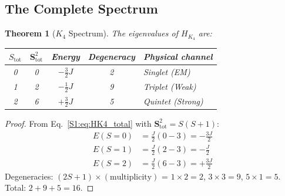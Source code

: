 \documentclass[11pt,a4paper]{article}
\newtheorem{theorem}{Theorem}[section]
\theoremstyle{definition}
\begin{document}
\subsection{The Complete Spectrum}

\begin{theorem}[$K_4$ Spectrum]
\label{S1:thm:K4_spectrum}
The eigenvalues of $H_{K_4}$ are:
\begin{center}
\begin{tabular}{ccccl}
\toprule
$S_{\mathrm{tot}}$ & $\mathbf{S}_{\mathrm{tot}}^2$ & Energy & Degeneracy & Physical channel\\
\midrule
0 & 0 & $-\tfrac{3}{2}J$ & 2 & Singlet (EM) \\
1 & 2 & $-\tfrac{1}{2}J$ & 9 & Triplet (Weak) \\
2 & 6 & $+\tfrac{3}{2}J$ & 5 & Quintet (Strong) \\
\bottomrule
\end{tabular}
\end{center}
\end{theorem}

\begin{proof}
From Eq.~\eqref{S1:eq:HK4_total} with $\mathbf{S}_{\mathrm{tot}}^2 = S(S+1)$:
\begin{align}
E(S=0) &= \frac{J}{2}(0 - 3) = -\frac{3J}{2} \label{S1:eq:E0}\\
E(S=1) &= \frac{J}{2}(2 - 3) = -\frac{J}{2} \label{S1:eq:E1}\\
E(S=2) &= \frac{J}{2}(6 - 3) = +\frac{3J}{2} \label{S1:eq:E2}
\end{align}
Degeneracies: $(2S+1) \times (\text{multiplicity})$ = $1 \times 2 = 2$, $3 \times 3 = 9$, $5 \times 1 = 5$. Total: $2 + 9 + 5 = 16$.
\end{proof}
\end{document}
